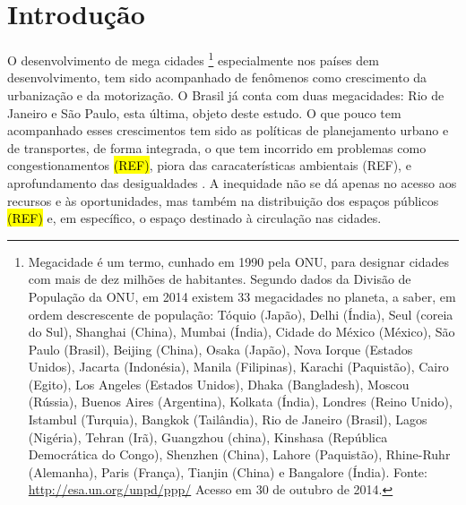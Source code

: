 \chapter*[Introdução]{Introdução}



O desenvolvimento de mega cidades
\footnote{Megacidade é um termo, cunhado em 1990 pela ONU, para designar cidades com mais de dez milhões de habitantes. Segundo dados da Divisão de População da ONU, em 2014 existem 33 megacidades no planeta, a saber, em ordem descrescente de população: Tóquio (Japão), Delhi (Índia), Seul (coreia do Sul), Shanghai (China), Mumbai (Índia), Cidade do México (México), São Paulo (Brasil), Beijing (China), Osaka (Japão), Nova Iorque (Estados Unidos), Jacarta (Indonésia), Manila (Filipinas), Karachi (Paquistão), Cairo (Egito), Los Angeles (Estados Unidos), Dhaka (Bangladesh), Moscou (Rússia), Buenos Aires (Argentina), Kolkata (Índia), Londres (Reino Unido), Istambul (Turquia), Bangkok (Tailândia), Rio de Janeiro (Brasil), Lagos (Nigéria), Tehran (Irã), Guangzhou (china), Kinshasa (República Democrática do Congo), Shenzhen (China), Lahore (Paquistão), Rhine-Ruhr (Alemanha), Paris (França), Tianjin (China) e Bangalore (Índia). Fonte: \url{http://esa.un.org/unpd/ppp/} Acesso em 30 de outubro de 2014.}
especialmente nos países dem desenvolvimento, tem sido acompanhado de fenômenos como crescimento da urbanização e da motorização. O Brasil já conta com duas megacidades: Rio de Janeiro e São Paulo, esta última, objeto deste estudo.
O que pouco tem acompanhado esses crescimentos tem sido as políticas de planejamento urbano e de transportes, de forma integrada, o que tem incorrido em problemas como congestionamentos \hl{(REF)}, piora das caracaterísticas ambientais (REF), e aprofundamento das desigualdades \cite{AHMED2008}.
A inequidade não se dá apenas no acesso aos recursos e às oportunidades, mas também na distribuição dos espaços públicos \hl{(REF)} e, em específico, o espaço destinado à circulação nas cidades.

